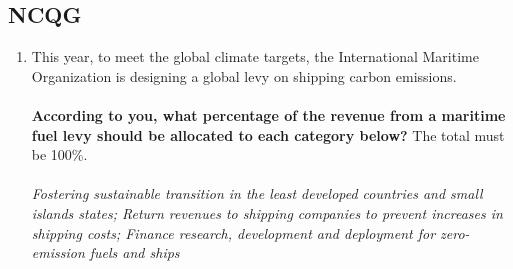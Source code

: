  \subsection*{NCQG} 
 \begin{enumerate}[resume] 
\item  \label{q:maritime_split} This year, to meet the global climate targets, the International Maritime Organization is designing a global levy on shipping carbon emissions.\\\\\textbf{According to you, what percentage of the revenue from a maritime fuel levy should be allocated to each category below?} The total must be 100\%.\\ [\textit{Figure \ref{fig:maritime_split}}; 
\verb|maritime_split|]
  \\ \textit{Fostering sustainable transition in the least developed countries and small islands states; Return revenues to shipping companies to prevent increases in shipping costs; Finance research, development and deployment for zero-emission fuels and ships}


\end{enumerate}
